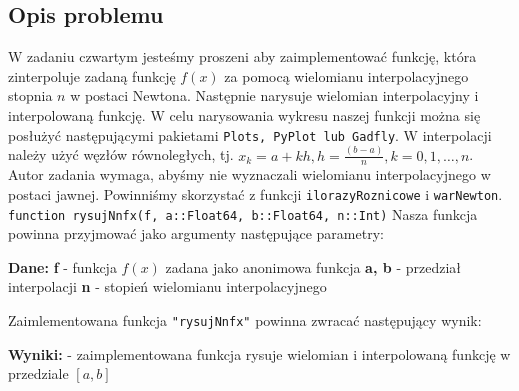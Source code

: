 \documentclass{article}
\begin{document}
\begin{center}
    \subsection{Opis problemu}
     \large W zadaniu czwartym jesteśmy proszeni aby zaimplementować funkcję, która zinterpoluje zadaną funkcję \(f(x)\)
     za pomocą wielomianu interpolacyjnego stopnia \(n\) w postaci Newtona. \newline
     Następnie narysuje wielomian interpolacyjny i interpolowaną funkcję. W celu narysowania wykresu naszej funkcji można się posłużyć następującymi pakietami \texttt{Plots, PyPlot lub Gadfly}. \newline 
     W interpolacji należy użyć węzłów równoległych, tj. \(x_{k} = a + kh, h = \frac{(b-a)}{n}, k = 0,1,\dots,n\). \newline
     Autor zadania wymaga, abyśmy nie wyznaczali wielomianu interpolacyjnego w postaci jawnej. \newline
     Powinniśmy skorzystać z funkcji \texttt{ilorazyRoznicowe} i \texttt{warNewton}. \newline
     \texttt{function rysujNnfx(f, a::Float64, b::Float64, n::Int)} \newline
     Nasza funkcja powinna przyjmować jako argumenty następujące parametry: \newline
     \begin{flushleft}
        \textbf{Dane:} \newline  
        \textbf{f} - funkcja \(f(x)\) zadana jako anonimowa funkcja \newline
        \textbf{a, b} - przedział interpolacji \newline
        \textbf{n} - stopień wielomianu interpolacyjnego
     \end{flushleft}
     Zaimlementowana funkcja \texttt{"rysujNnfx"} powinna zwracać następujący wynik: \newline
     \begin{flushleft}
        \textbf{Wyniki:} \newline  
        - zaimplementowana funkcja rysuje wielomian i interpolowaną funkcję w przedziale \([a,b]\)
     \end{flushleft}


\end{center}
\end{document}
